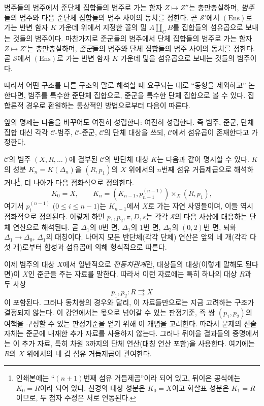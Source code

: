  범주들의 범주에서 준단체 집합들의 범주로 가는
함자 $Z\longmapsto Z''$는 충만충실하며, \emph{범주}들의 범주와 다음
준단체 집합들의 범주 사이의 동치를 정한다. 곧 $\mathcal S'$에서
$(\mathrm{Ens})$로 가는 반변 함자 $K$ 가운데 위에서 지정한 꼴의 밂
$A\amalg_C B$를 집합들의 섬유곱으로 보내는 것들의 범주이다. 마찬가지로
준군들의 범주에서 단체 집합들의 범주로 가는 함자 $Z\longmapsto Z'$는
충만충실하며, \emph{준군}들의 범주와
단체 집합들의 범주 사이의 동치를 정한다. 곧 $\mathcal S$에서
$(\mathrm{Ens})$로 가는 반변 함자 $K$ 가운데 밂을 섬유곱으로 보내는
것들의 범주이다.

따라서 어떤 구조를 다른 구조의 말로 해석할 때 요구되는 대로 ``동형을
제외하고'' 논한다면, 범주를 특수한 준단체 집합으로, 준군을 특수한 단체
집합으로 볼 수 있다. 집합론적 경우로 환원하는 통상적인 방법으로부터
다음이 따른다.

 앞의 명제는 다음을 바꾸어도 여전히 성립한다:
여전히 성립한다. 즉 범주, 준군, 단체 집합 대신 각각
$\mathcal C$-범주, $\mathcal C$-준군, $\mathcal C$의 단체 대상을 쓰되,
$\mathcal C$에서 섬유곱이 존재한다고 가정한다.

$\mathcal C$의 범주 $(X,R,\ldots)$에 결부된 $\mathcal C$의 반단체 대상
$K$는 다음과 같이 명시할 수 있다. $K$의 성분
$K_n=K(\Delta_n)$을 $(R,p_1)$의 $X$ 위에서의 $n$번째 섬유
거듭제곱으로 해석하거나\footnote{인쇄본에는
“$(n+1)$번째 섬유 거듭제곱”이라 되어 있고, 뒤이은 공식에는
$K_0=R$이라 되어 있다. 신경의 대상 성분은 $K_0=X$이고 화살표
성분은 $K_1=R$이므로, 두 첨자 수정은 서로 연동된다.}, 더 나아가
다음 점화식으로 정의한다.
\[
  K_0=X,\qquad
  K_n=(K_{n-1},p_{n-1}^{(n-1)})\times_X(R,p_1),
\]
여기서 $p_i^{(n-1)}$ ($0\leq i\leq n-1$)는 $K_{n-1}$에서 $X$로 가는
자연 사영들이며, 이들 역시 점화적으로 정의된다. 이렇게 하면
$p_1,p_2,\pi,D,s$는 각각 $\mathcal S$의 다음 사상에 대응하는 단체
연산으로 해석된다. 곧 $\Delta_1$의 $0$번 면, $\Delta_1$의 $1$번
면, $\Delta_2$의 $(0,2)$번 면, 퇴화 $\Delta_1\to\Delta_0$,
$\Delta_1$의 대칭이다. 나머지 모든 반단체(각각 단체) 연산은 앞의
네 개(각각 다섯 개)로부터 합성과 섬유곱에 의해 형식적으로 따른다.

이제 범주의 대상 $X$에서 일반적으로 \emph{전동치관계}란, 대상들의
대상(이렇게 말해도 된다면)이 $X$인 준군을 주는 자료를 말한다. 따라서
이런 자료에는 특히 하나의 대상 $R$과 두 사상
\[
  p_1,p_2:R\rightrightarrows X
\]
이 포함된다. 그러나 동치쌍의 경우와 달리, 이 자료들만으로는 지금
고려하는 구조가 결정되지 않는다. 이 강연에서는 몫으로 넘어갈 수
있는 판정기준, 즉 쌍 $(p_1,p_2)$의 여핵을 구성할 수 있는 판정기준을
얻기 위해 이 개념을 고려한다. 따라서 문제의 진술 자체는 준군에 내재한
추가 자료를 사용하지 않는다. 그러나 뒤이을 결과들의 증명에서는
이 추가 자료, 특히 차원 $3$까지의 단체 연산(대칭 연산 포함)을
사용한다. 여기에는 $R$의 $X$ 위에서의 네 겹 섬유 거듭제곱이 관여한다.

